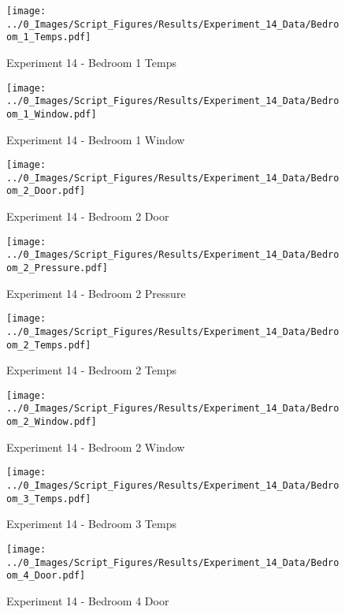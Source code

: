 	\begin{figure}[H]
		\centering
		\texttt{[image: ../0\_Images/Script\_Figures/Results/Experiment\_14\_Data/Bedroom\_1\_Temps.pdf]}
		\caption[]{Experiment 14 - Bedroom 1 Temps}
	\end{figure}
 
	\clearpage

	\begin{figure}[H]
		\centering
		\texttt{[image: ../0\_Images/Script\_Figures/Results/Experiment\_14\_Data/Bedroom\_1\_Window.pdf]}
		\caption[]{Experiment 14 - Bedroom 1 Window}
	\end{figure}
 

	\begin{figure}[H]
		\centering
		\texttt{[image: ../0\_Images/Script\_Figures/Results/Experiment\_14\_Data/Bedroom\_2\_Door.pdf]}
		\caption[]{Experiment 14 - Bedroom 2 Door}
	\end{figure}
 
	\clearpage

	\begin{figure}[H]
		\centering
		\texttt{[image: ../0\_Images/Script\_Figures/Results/Experiment\_14\_Data/Bedroom\_2\_Pressure.pdf]}
		\caption[]{Experiment 14 - Bedroom 2 Pressure}
	\end{figure}
 

	\begin{figure}[H]
		\centering
		\texttt{[image: ../0\_Images/Script\_Figures/Results/Experiment\_14\_Data/Bedroom\_2\_Temps.pdf]}
		\caption[]{Experiment 14 - Bedroom 2 Temps}
	\end{figure}
 
	\clearpage

	\begin{figure}[H]
		\centering
		\texttt{[image: ../0\_Images/Script\_Figures/Results/Experiment\_14\_Data/Bedroom\_2\_Window.pdf]}
		\caption[]{Experiment 14 - Bedroom 2 Window}
	\end{figure}
 

	\begin{figure}[H]
		\centering
		\texttt{[image: ../0\_Images/Script\_Figures/Results/Experiment\_14\_Data/Bedroom\_3\_Temps.pdf]}
		\caption[]{Experiment 14 - Bedroom 3 Temps}
	\end{figure}
 
	\clearpage

	\begin{figure}[H]
		\centering
		\texttt{[image: ../0\_Images/Script\_Figures/Results/Experiment\_14\_Data/Bedroom\_4\_Door.pdf]}
		\caption[]{Experiment 14 - Bedroom 4 Door}
	\end{figure}
 

